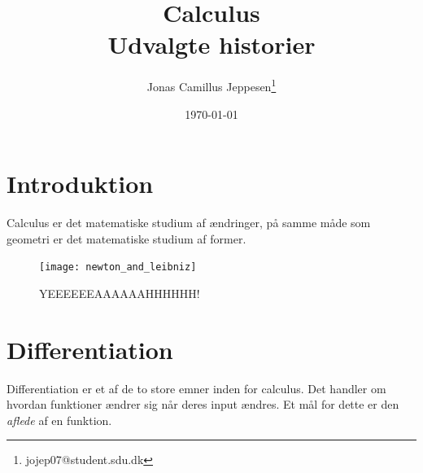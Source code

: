 \documentclass[a4paper, 11pt]{article}
\title{{\Huge Calculus}\\ Udvalgte historier}
\date{\today}
\author{Jonas Camillus Jeppesen\thanks{jojep07@student.sdu.dk}}
\begin{document}
\maketitle
\newpage

\tableofcontents
\newpage

\section{Introduktion}
Calculus er det matematiske studium af ændringer, på samme måde som geometri er det matematiske studium af former.
\begin{figure}[h]
	\centering
	\texttt{[image: newton\_and\_leibniz]}
	\caption{YEEEEEEAAAAAAHHHHHH!}
\end{figure}

\section{Differentiation}
Differentiation er et af de to store emner inden for calculus. Det handler om hvordan funktioner ændrer sig når deres input ændres. Et mål for dette er den \emph{aflede} af en funktion. 
\end{document}
